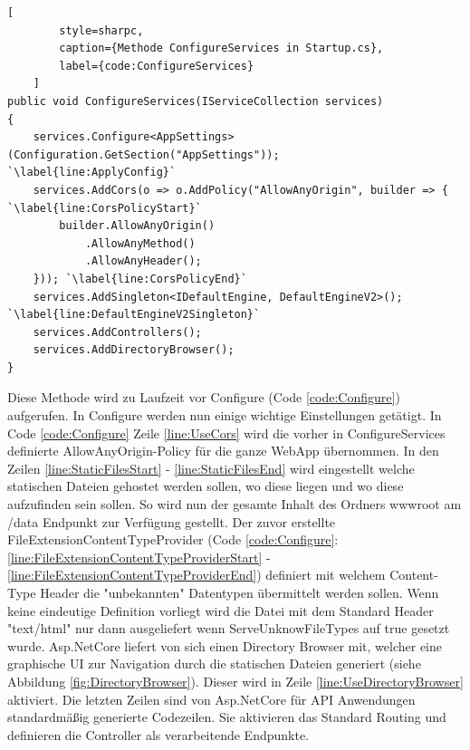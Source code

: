 \begin{codeblock}
	\begin{lstlisting}[
		style=sharpc,
		caption={Methode ConfigureServices in Startup.cs},
		label={code:ConfigureServices}
	]
public void ConfigureServices(IServiceCollection services)
{
	services.Configure<AppSettings>(Configuration.GetSection("AppSettings"));	`\label{line:ApplyConfig}`
	services.AddCors(o => o.AddPolicy("AllowAnyOrigin", builder => { `\label{line:CorsPolicyStart}`
		builder.AllowAnyOrigin()
			.AllowAnyMethod()
			.AllowAnyHeader();
	})); `\label{line:CorsPolicyEnd}`
	services.AddSingleton<IDefaultEngine, DefaultEngineV2>(); `\label{line:DefaultEngineV2Singleton}`
	services.AddControllers();
	services.AddDirectoryBrowser();
}
	\end{lstlisting}
\end{codeblock}

Diese Methode wird zu Laufzeit vor Configure
(Code \ref{code:Configure}) aufgerufen. In Configure werden nun
einige wichtige Einstellungen getätigt. In Code \ref{code:Configure}
Zeile \ref{line:UseCors} wird die vorher in ConfigureServices definierte
\grqq AllowAnyOrigin\grqq -Policy für die ganze WebApp übernommen.
In den Zeilen \ref{line:StaticFilesStart} - \ref{line:StaticFilesEnd}
wird eingestellt welche statischen Dateien gehostet werden sollen,
wo diese liegen und wo diese aufzufinden sein sollen. So wird nun
der gesamte Inhalt des Ordners wwwroot am /data Endpunkt zur
Verfügung gestellt. Der zuvor erstellte FileExtensionContentTypeProvider
(Code \ref{code:Configure}:
\ref{line:FileExtensionContentTypeProviderStart} -
\ref{line:FileExtensionContentTypeProviderEnd})
definiert mit welchem Content-Type Header die "unbekannten"
Datentypen übermittelt werden sollen. Wenn keine eindeutige
Definition vorliegt wird die Datei mit dem Standard Header
"text/html" nur dann ausgeliefert wenn ServeUnknowFileTypes auf
true gesetzt wurde.
Asp.NetCore liefert von sich einen Directory Browser mit,
welcher eine graphische UI zur Navigation durch die statischen
Dateien generiert (siehe Abbildung \ref{fig:DirectoryBrowser}).
Dieser wird in Zeile \ref{line:UseDirectoryBrowser} aktiviert.
Die letzten Zeilen sind von Asp.NetCore für API Anwendungen
standardmäßig generierte Codezeilen. Sie aktivieren das Standard
Routing und definieren die Controller als verarbeitende Endpunkte.


